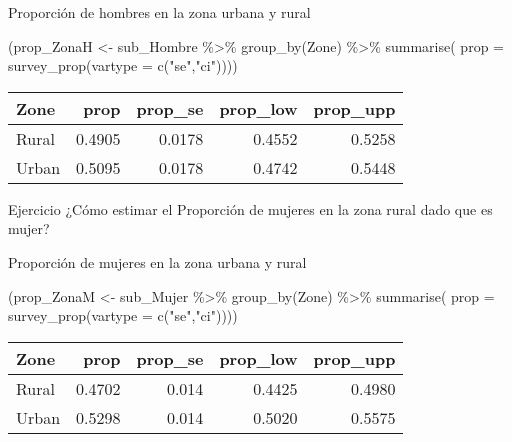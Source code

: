 \documentclass[
  ignorenonframetext,
]{beamer}
\newenvironment{Shaded}{\begin{snugshade}}{\end{snugshade}}
\newcommand{\AttributeTok}[1]{\textcolor[rgb]{0.77,0.63,0.00}{#1}}
\newcommand{\FunctionTok}[1]{\textcolor[rgb]{0.00,0.00,0.00}{#1}}
\newcommand{\NormalTok}[1]{#1}
\newcommand{\OtherTok}[1]{\textcolor[rgb]{0.56,0.35,0.01}{#1}}
\newcommand{\SpecialCharTok}[1]{\textcolor[rgb]{0.00,0.00,0.00}{#1}}
\newcommand{\StringTok}[1]{\textcolor[rgb]{0.31,0.60,0.02}{#1}}
\begin{document}
\begin{frame}[fragile]{Proporción de hombres en la zona urbana y rural}
\protect\hypertarget{proporciuxf3n-de-hombres-en-la-zona-urbana-y-rural}{}
\begin{Shaded}
\begin{Highlighting}[]
\NormalTok{(prop\_ZonaH }\OtherTok{\textless{}{-}}\NormalTok{ sub\_Hombre }\SpecialCharTok{\%\textgreater{}\%} \FunctionTok{group\_by}\NormalTok{(Zone) }\SpecialCharTok{\%\textgreater{}\%} 
   \FunctionTok{summarise}\NormalTok{(}
     \AttributeTok{prop =} \FunctionTok{survey\_prop}\NormalTok{(}\AttributeTok{vartype =} \FunctionTok{c}\NormalTok{(}\StringTok{"se"}\NormalTok{,}\StringTok{"ci"}\NormalTok{))))}
\end{Highlighting}
\end{Shaded}

\begin{longtable}[]{@{}lrrrr@{}}
\toprule
Zone & prop & prop\_se & prop\_low & prop\_upp \\
\midrule
\endhead
Rural & 0.4905 & 0.0178 & 0.4552 & 0.5258 \\
Urban & 0.5095 & 0.0178 & 0.4742 & 0.5448 \\
\bottomrule
\end{longtable}

\pause

\begin{block}{Ejercicio}
\protect\hypertarget{ejercicio-2}{}
¿Cómo estimar el Proporción de mujeres en la zona rural dado que es
mujer?
\end{block}
\end{frame}

\begin{frame}[fragile]{Proporción de mujeres en la zona urbana y rural}
\protect\hypertarget{proporciuxf3n-de-mujeres-en-la-zona-urbana-y-rural}{}
\begin{Shaded}
\begin{Highlighting}[]
\NormalTok{(prop\_ZonaM }\OtherTok{\textless{}{-}}\NormalTok{ sub\_Mujer }\SpecialCharTok{\%\textgreater{}\%} \FunctionTok{group\_by}\NormalTok{(Zone) }\SpecialCharTok{\%\textgreater{}\%} 
   \FunctionTok{summarise}\NormalTok{(}
    \AttributeTok{prop =} \FunctionTok{survey\_prop}\NormalTok{(}\AttributeTok{vartype =} \FunctionTok{c}\NormalTok{(}\StringTok{"se"}\NormalTok{,}\StringTok{"ci"}\NormalTok{))))}
\end{Highlighting}
\end{Shaded}

\begin{longtable}[]{@{}lrrrr@{}}
\toprule
Zone & prop & prop\_se & prop\_low & prop\_upp \\
\midrule
\endhead
Rural & 0.4702 & 0.014 & 0.4425 & 0.4980 \\
Urban & 0.5298 & 0.014 & 0.5020 & 0.5575 \\
\bottomrule
\end{longtable}
\end{frame}
\end{document}
